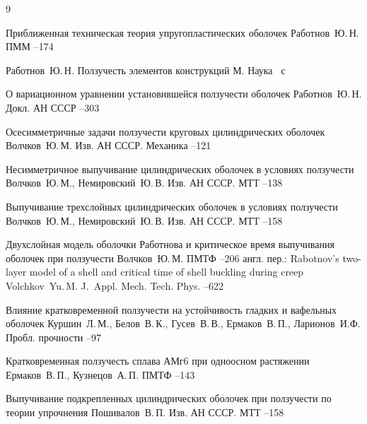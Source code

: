 \begin{thebibliography}{9}


 \paper Приближенная техническая теория упругопластических оболочек
\by Работнов~Ю.\,Н.
\jour ПММ  
--174

 \by Работнов~Ю.\,Н. \book Ползучесть элементов конструкций
\publaddr М. \publ Наука  ~с

 \paper О вариационном уравнении установившейся ползучести оболочек
\by Работнов~Ю.\,Н. \jour Докл. АН СССР   --303


 \paper Осесимметричные задачи ползучести круговых цилиндрических
 оболочек \by    Волчков~Ю.\,М. \jour Изв. АН СССР. Механика
  --121

 \paper Несимметричное выпучивание цилиндрических оболочек в
условиях ползучести \by    Волчков~Ю.\,М., Немировский~Ю.\,В. \jour Изв. АН СССР.
МТТ   --138

 \paper Выпучивание трехслойных цилиндрических оболочек в условиях
ползучести \by    Волчков~Ю.\,М., Немировский~Ю.\,В. \jour Изв. АН СССР. МТТ   --158

 \paper Двухслойная модель оболочки Работнова и критическое время
выпучивания оболочек при ползучести \by Волчков~Ю.\,М. \jour ПМТФ   --206
\transl англ. пер.:
\paper Rabotnov’s two-layer model of a shell and critical time of shell buckling during creep
\by  Volchkov~Yu.\,M.
\jour J.~Appl. Mech. Tech. Phys.
   --622


 \paper Влияние кратковременной ползучести на устойчивость гладких и
вафельных оболочек \by Куршин~Л.\,М., Белов~В.\,К., Гусев~В.\,В., Ермаков~В.\,П.,
Ларионов~И.Ф. \jour Пробл. прочности   --97

 \paper Кратковременная ползучесть сплава АМг6 при одноосном
растяжении \by Ермаков~В.\,П., Кузнецов~А.\,П. \jour ПМТФ  --143

 \paper Выпучивание подкрепленных цилиндрических оболочек при
ползучести по теории упрочнения \by Пошивалов~В.\,П. \jour Изв. АН СССР. МТТ  --158

\end{thebibliography}



\makeengtitlem

%
